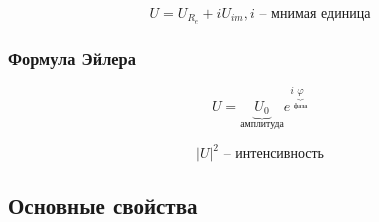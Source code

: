 \begin{equation*}
    U = U_{R_e} + i U_{im}, i \text{ -- мнимая единица}
\end{equation*}

\subsubsection{Формула Эйлера}

\begin{equation*}
    U = \underbrace{U_0}_{\text{амплитуда}} e^{i \underbrace{\varphi}_{\text{фаза}}}
\end{equation*}

\begin{equation*}
    |U|^2 \text{ -- интенсивность}
\end{equation*}

\subsection{Основные свойства}

